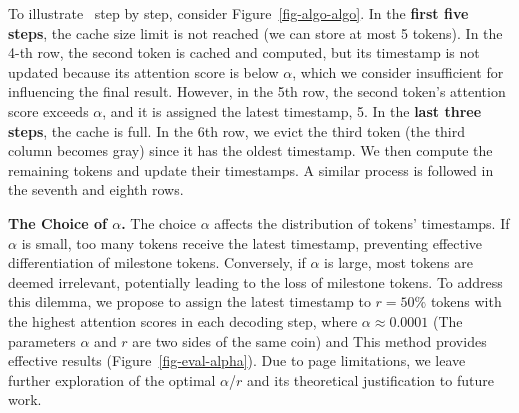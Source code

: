 To illustrate \algo\ step by step, consider Figure~\ref{fig-algo-algo}. In the \textbf{first five steps}, the cache size limit is not reached (we can store at most 5 tokens). In the 4-th row, the second token is cached and computed, but its timestamp is not updated because its attention score is below $\alpha$, which we consider insufficient for influencing the final result. However, in the 5th row, the second token’s attention score exceeds $\alpha$, and it is assigned the latest timestamp, 5. In the \textbf{last three steps}, the cache is full. In the 6th row, we evict the third token (the third column becomes gray) since it has the oldest timestamp. We then compute the remaining tokens and update their timestamps. A similar process is followed in the seventh and eighth rows.



\textbf{The Choice of $\alpha$.} The choice $\alpha$ affects the distribution of tokens' timestamps. If $\alpha$ is small, too many tokens receive the latest timestamp, preventing effective differentiation of milestone tokens. Conversely, if $\alpha$ is large, most tokens are deemed irrelevant, potentially leading to the loss of milestone tokens. To address this dilemma, we propose to assign the latest timestamp to $r = 50\%$ tokens with the highest attention scores in each decoding step, where $\alpha\approx 0.0001$ (The parameters $\alpha$ and $r$ are two sides of the same coin) and This method provides effective results (Figure~\ref{fig-eval-alpha}). Due to page limitations, we leave further exploration of the optimal $\alpha$/$r$ and its theoretical justification to future work.



